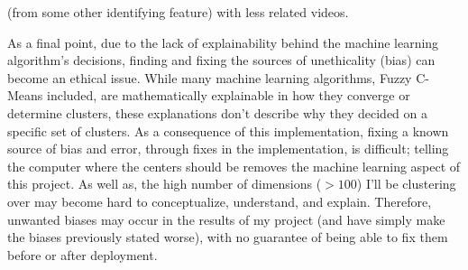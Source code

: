 \documentclass[10pt,twocolumn]{article}
\begin{document}
(from some other identifying feature) with less related videos.

As a final point, due to the lack of explainability behind the machine learning algorithm’s decisions, finding and fixing the sources of unethicality (bias) can become an ethical issue. While many machine learning algorithms, Fuzzy C-Means included, are mathematically explainable in how they converge or determine clusters, these explanations don’t describe why they decided on a specific set of clusters. As a consequence of this implementation, fixing a known source of bias and error, through fixes in the implementation, is difficult; telling the computer where the centers should be removes the machine learning aspect of this project. As well as, the high number of dimensions (\(>100\)) I'll be clustering over may become hard to conceptualize, understand, and explain. Therefore, unwanted biases may occur in the results of my project (and have simply make the biases previously stated worse), with no guarantee of being able to fix them before or after deployment. 

\end{document}
